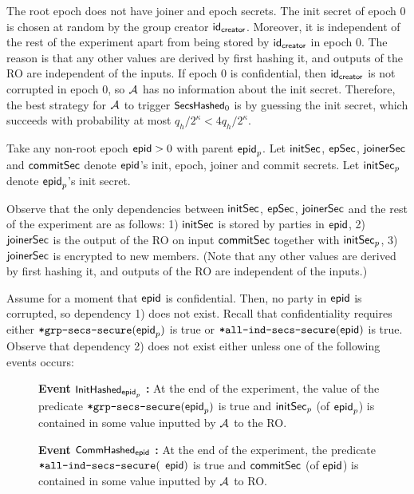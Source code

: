 The root epoch does not have joiner and epoch secrets. The init secret of epoch $0$ is chosen at random by the group creator ${\mathsf{id}}_\mathsf{creator}$. Moreover, it is independent of the rest of the experiment apart from being stored by ${\mathsf{id}}_\mathsf{creator}$ in epoch $0$. The reason is that any other values are derived by first hashing it, and outputs of the RO are independent of the inputs.
If epoch $0$ is confidential, then ${\mathsf{id}}_\mathsf{creator}$ is not corrupted in epoch $0$, so $\mathcal{A}_{\relax}$ has no information about the init secret. Therefore, the best strategy for $\mathcal{A}_{\relax}$ to trigger $\textnormal{\textsf{\small SecsHashed}}_0$ is by guessing the init secret, which succeeds with probability at most $q_h/2^\kappa < 4q_h/2^\kappa$.

Take any non-root epoch ${\normalfont\textsf{epid}}>0$ with parent ${\normalfont\textsf{epid}}_p$. Let ${\mathsf{initSec}}$, ${\mathsf{epSec}}$, ${\mathsf{joinerSec}}$ and ${\mathsf{commitSec}}$ denote ${\normalfont\textsf{epid}}$'s init, epoch, joiner and commit secrets. Let ${\mathsf{initSec}}_p$ denote ${\normalfont\textsf{epid}}_p$'s init secret.

Observe that the only dependencies between ${\mathsf{initSec}}$, ${\mathsf{epSec}}$, ${\mathsf{joinerSec}}$ and the rest of the experiment are as follows: 1) ${\mathsf{initSec}}$ is stored by parties in ${\normalfont\textsf{epid}}$, 2) ${\mathsf{joinerSec}}$ is the output of the RO on input ${\mathsf{commitSec}}$ together with ${\mathsf{initSec}}_p$, 3) ${\mathsf{joinerSec}}$ is encrypted to new members. (Note that any other values are derived by first hashing it, and outputs of the RO are independent of the inputs.)

Assume for a moment that ${\normalfont\textsf{epid}}$ is confidential. Then, no party in ${\normalfont\textsf{epid}}$ is corrupted, so dependency 1) does not exist. Recall that confidentiality requires either ${\textnormal{\tt*grp-secs-secure}}({\normalfont\textsf{epid}}_p)$ is true or ${\textnormal{\tt*all-ind-secs-secure}}({\normalfont\textsf{epid}})$ is true. Observe that dependency 2) does not exist either unless one of the following events occurs:
\begin{description}
  \item[] {\bf Event $\textnormal{\textsf{\small InitHashed}}_{{\normalfont\textsf{epid}}_p}$ : } At the end of the experiment, the value of the predicate ${\textnormal{\tt*grp-secs-secure}}({\normalfont\textsf{epid}}_p)$ is true and ${\mathsf{initSec}}_p$ (of ${\normalfont\textsf{epid}}_p$) is contained in some value inputted by $\mathcal{A}_{\relax}$ to the RO.
  \item[] {\bf Event $\textnormal{\textsf{\small CommHashed}}_{{\normalfont\textsf{epid}}}$ : } At the end of the experiment, the predicate ${\textnormal{\tt*all-ind-secs-secure}}($ ${\normalfont\textsf{epid}})$ is true and ${\mathsf{commitSec}}$ (of ${\normalfont\textsf{epid}}$) is contained in some value inputted by $\mathcal{A}_{\relax}$ to RO.
\end{description}

